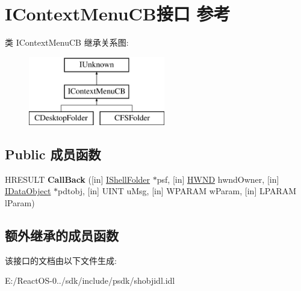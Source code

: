 \hypertarget{interface_i_context_menu_c_b}{}\section{I\+Context\+Menu\+C\+B接口 参考}
\label{interface_i_context_menu_c_b}
类 I\+Context\+Menu\+CB 继承关系图\+:\begin{figure}[H]
\begin{center}
\leavevmode
\includegraphics[height=3.000000cm]{interface_i_context_menu_c_b}
\end{center}
\end{figure}
\subsection*{Public 成员函数}
\begin{DoxyCompactItemize}
\item 
\mbox{\label{interface_i_context_menu_c_b_ad617c2a3449bb6fcc61f0f7dc18a6bec}} 
H\+R\+E\+S\+U\+LT {\bfseries Call\+Back} (\mbox{[}in\mbox{]} \hyperlink{interface_i_shell_folder}{I\+Shell\+Folder} $\ast$psf, \mbox{[}in\mbox{]} \hyperlink{interfacevoid}{H\+W\+ND} hwnd\+Owner, \mbox{[}in\mbox{]} \hyperlink{interface_i_data_object}{I\+Data\+Object} $\ast$pdtobj, \mbox{[}in\mbox{]} U\+I\+NT u\+Msg, \mbox{[}in\mbox{]} W\+P\+A\+R\+AM w\+Param, \mbox{[}in\mbox{]} L\+P\+A\+R\+AM l\+Param)
\end{DoxyCompactItemize}
\subsection*{额外继承的成员函数}


该接口的文档由以下文件生成\+:\begin{DoxyCompactItemize}
\item 
E\+:/\+React\+O\+S-\/0../sdk/include/psdk/shobjidl.\+idl\end{DoxyCompactItemize}

